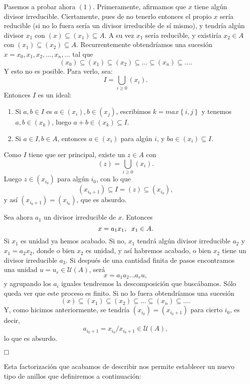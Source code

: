 \documentclass[12pt]{article}
\begin{document}
Pasemos a probar ahora $(1)$. Primeramente, afirmamos que $x$ tiene algún divisor irreducible. Ciertamente, pues de no tenerlo entonces el propio $x$ sería reducible (si no lo fuera sería un divisor irreducible de sí mismo), y tendría algún divisor $x_{1}$ con $(x) \subseteq (x_{1}) \subseteq A.$ A su vez $x_{1}$ sería reducible, y existiría $x_{2} \in A$ con $(x_{1}) \subseteq (x_{2}) \subseteq A$. Recurrentemente obtendríamos una sucesión $x = x_{0}, x_{1}, x_{2}, \ldots , x_{n}, \ldots$ tal que $$(x_{0}) \subseteq (x_{1}) \subseteq (x_{2}) \subseteq \ldots \subseteq (x_{n}) \subseteq \ldots .$$ Y esto no es posible. Para verlo, sea: $$ I = \bigcup_{i \geq 0} (x_{i}).$$ Entonces $I$ es un ideal: \begin{enumerate}
\item Si $a,b \in I$ es $a \in (x_{i}), b \in (x_{j})$, escribimos $k = max\left\lbrace i,j\right\rbrace$ y tenemos $a,b \in (x_{k})$, luego $a + b \in (x_{k}) \subseteq I$.
\item  Si $a \in I, b \in A$, entonces $a \in (x_{i})$ para algún $i$, y $ba \in (x_{i}) \subseteq I$. 
\end{enumerate}
Como $I$ tiene que ser principal, existe un $z \in A$ con $$(z) = \bigcup_{i \geq 0} (x_{i}).$$ Luego $z \in (x_{i_{0}})$ para algún $i_{0}$, con lo que $$(x_{i_{0}+1}) \subseteq I = (z) \subseteq (x_{i_{0}}),$$ y así $(x_{i_{0}+1}) = (x_{i_{0}})$, que es absurdo.

Sea ahora $a_{1}$ un divisor irreducible de $x$. Entonces $$x = a_{1}x_{1}, \hspace{0.2cm} x_{1} \in A.$$ Si $x_{1}$ es unidad ya hemos acabado. Si no, $x_{1}$ tendrá algún divisor irreducible $a_{2}$ y $x_{1} = a_{2}x_{2}$, donde o bien $x_{2}$ es unidad, y así habremos acabado, o bien $x_{2}$ tiene un divisor irreducible $a_{3}$. Si después de una cantidad finita de pasos encontramos una unidad $u = u_{r} \in \mathcal{U}(A)$, será $$x = a_{1}a_{2} \ldots a_{r}u,$$ y agrupando los $a_{i}$ iguales tendremos la descomposición que buscábamos. Sólo queda ver que este proceso es finito. Si no lo fuera obtendríamos una sucesión $$(x) \subseteq (x_{1}) \subseteq (x_{2}) \subseteq \ldots \subseteq (x_{n}) \subseteq \ldots .$$ Y, como hicimos anteriormente, se tendría $(x_{i_{0}}) = (x_{i_{0}+1})$ para cierto $i_{0}$, es decir, $$a_{i_{0}+1} = x_{i_{0}}/ x_{i_{0}+1} \in \mathcal{U}(A),$$ lo que es absurdo.

$\hfill \square$

Esta factorización que acabamos de describir nos permite establecer un nuevo tipo de anillos que definiremos a continuación:
\end{document}
